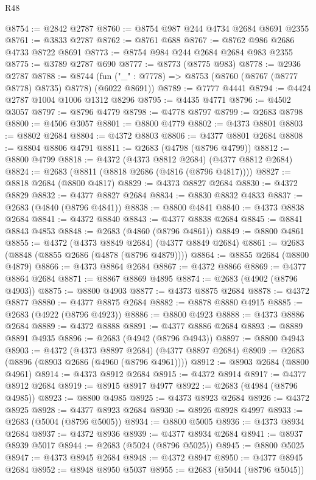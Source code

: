 \begin{lexlean}{R48}
\begin{coremodule}
@8754 := @2842 @2787
@8760 := @8754 @987 @244 @4734 @2684 @8691 @2355
@8761 := @3833 @2787
@8762 := @8761 @688
@8767 := @8762 @986 @2686 @4733 @8722 @8691
@8773 := @8754 @984 @244 @2684 @2684 @983 @2355
@8775 := @3789 @2787 @690
@8777 := @8773 (@8775 @983)
@8778 := @2936 @2787
@8788 := @8744 (fun ("_" : @7778) => @8753 (@8760 (@8767 (@8777 @8778) @8735) @8778) (@6022 @8691))
@8789 := @7777 @4441
@8794 := @4424 @2787 @1004 @1006 @1312 @8296
@8795 := @4435 @4771
@8796 := @4502 @3057
@8797 := @8796 @4779
@8798 := @4778 @8797
@8799 := @2683 @8798
@8800 := @4506 @3057
@8801 := @8800 @4779
@8802 := @4373 @8801
@8803 := @8802 @2684
@8804 := @4372 @8803
@8806 := @4377 @8801 @2684
@8808 := @8804 @8806 @4791
@8811 := @2683 (@4798 (@8796 @4799))
@8812 := @8800 @4799
@8818 := @4372 (@4373 @8812 @2684) (@4377 @8812 @2684)
@8824 := @2683 (@8811 (@8818 @2686 (@4816 (@8796 @4817))))
@8827 := @8818 @2684 (@8800 @4817)
@8829 := @4373 @8827 @2684
@8830 := @4372 @8829
@8832 := @4377 @8827 @2684
@8834 := @8830 @8832 @4833
@8837 := @2683 (@4840 (@8796 @4841))
@8838 := @8800 @4841
@8840 := @4373 @8838 @2684
@8841 := @4372 @8840
@8843 := @4377 @8838 @2684
@8845 := @8841 @8843 @4853
@8848 := @2683 (@4860 (@8796 @4861))
@8849 := @8800 @4861
@8855 := @4372 (@4373 @8849 @2684) (@4377 @8849 @2684)
@8861 := @2683 (@8848 (@8855 @2686 (@4878 (@8796 @4879))))
@8864 := @8855 @2684 (@8800 @4879)
@8866 := @4373 @8864 @2684
@8867 := @4372 @8866
@8869 := @4377 @8864 @2684
@8871 := @8867 @8869 @4895
@8874 := @2683 (@4902 (@8796 @4903))
@8875 := @8800 @4903
@8877 := @4373 @8875 @2684
@8878 := @4372 @8877
@8880 := @4377 @8875 @2684
@8882 := @8878 @8880 @4915
@8885 := @2683 (@4922 (@8796 @4923))
@8886 := @8800 @4923
@8888 := @4373 @8886 @2684
@8889 := @4372 @8888
@8891 := @4377 @8886 @2684
@8893 := @8889 @8891 @4935
@8896 := @2683 (@4942 (@8796 @4943))
@8897 := @8800 @4943
@8903 := @4372 (@4373 @8897 @2684) (@4377 @8897 @2684)
@8909 := @2683 (@8896 (@8903 @2686 (@4960 (@8796 @4961))))
@8912 := @8903 @2684 (@8800 @4961)
@8914 := @4373 @8912 @2684
@8915 := @4372 @8914
@8917 := @4377 @8912 @2684
@8919 := @8915 @8917 @4977
@8922 := @2683 (@4984 (@8796 @4985))
@8923 := @8800 @4985
@8925 := @4373 @8923 @2684
@8926 := @4372 @8925
@8928 := @4377 @8923 @2684
@8930 := @8926 @8928 @4997
@8933 := @2683 (@5004 (@8796 @5005))
@8934 := @8800 @5005
@8936 := @4373 @8934 @2684
@8937 := @4372 @8936
@8939 := @4377 @8934 @2684
@8941 := @8937 @8939 @5017
@8944 := @2683 (@5024 (@8796 @5025))
@8945 := @8800 @5025
@8947 := @4373 @8945 @2684
@8948 := @4372 @8947
@8950 := @4377 @8945 @2684
@8952 := @8948 @8950 @5037
@8955 := @2683 (@5044 (@8796 @5045))

\end{coremodule}
\end{lexlean}
